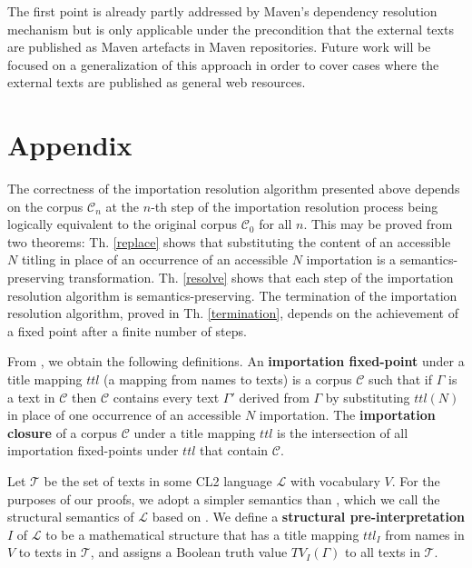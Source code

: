 \documentclass{IOS-Book-Article}
\newcommand{\corp}{ \mathcal{C} }
\newcommand{\texts}{ \mathcal{T} }
\newcommand{\lan}{ \mathcal{L} }
\newcommand{\sentstate}{ \mathcal{S} }
\newcommand{\ttl}{\mathit{ttl}}
\newcommand{\TV}{\mathit{TV}}
\begin{document}
The first point is already partly addressed by Maven's dependency resolution mechanism but is only applicable under the precondition that the external texts are published as Maven artefacts in Maven repositories.
Future work will be focused on a generalization of this approach in order to cover cases where the external texts are published as general web resources.

\appendix
\section{Appendix}
\label{appendix}
The correctness of the importation resolution algorithm presented above depends on the corpus $\corp_{n}$ at the $n$-th step of the importation resolution process being logically equivalent to the original corpus $\corp_0$ for all $n$. This may be proved from two theorems: Th. \ref{replace} shows that substituting the content of an accessible $N$ titling in place of an occurrence of an accessible $N$ importation is a semantics-preserving transformation. Th. \ref{resolve} shows that each step of the importation resolution algorithm is semantics-preserving.
The termination of the importation resolution algorithm, proved in Th. \ref{termination}, depends on the achievement of a fixed point after a finite number of steps.

From \cite{CDv2}, we obtain the following definitions. An \textbf{importation fixed-point} under a title mapping $\ttl$ (a mapping from names to texts) is a corpus $\corp$ such that if $\Gamma$ is a text in $\corp$ then $\corp$ contains every text $\Gamma'$ derived from $\Gamma$ by substituting $\ttl(N)$ in place of one occurrence of an accessible $N$ importation. 
The \textbf{importation closure} of a corpus $\corp$ under a title mapping $\ttl$ is the intersection of all importation fixed-points under $\ttl$ that contain $\corp$.

Let $\texts$ be the set of texts in some CL2 language $\lan$ with vocabulary $V$. 
For the purposes of our proofs, we adopt a simpler semantics  than \cite{CDv2}, which we call the structural semantics of $\lan$ based on \cite{Athan2013}.
We define a \textbf{structural pre-interpretation} $I$ of $\lan$  to be a mathematical structure that has a title mapping $\ttl_I$ from names in $V$ to texts in $\texts$, and assigns a Boolean truth value $\TV_I(\Gamma)$ to all texts in $\texts$.
\end{document}
